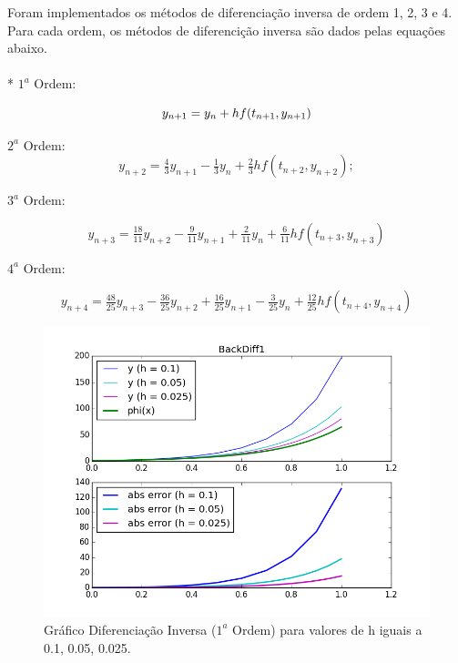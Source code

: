 \documentclass[a4paper]{article}
\begin{document}
Foram implementados os métodos de diferenciação inversa de ordem 1, 2, 3 e 4. Para cada ordem, os métodos de diferencição inversa são dados pelas equações abaixo.
\vspace{10mm} %
\\
\\*
$1^a$ Ordem: 

\begin{dmath}
\label{eq:backdiff1}
y_{n+1} = y_n + h f(t_{n+1}, y_{n+1}) \\
\end{dmath}

$2^a$ Ordem: 
\begin{dmath}
\label{eq:backdiff2}
y_{n+2} = \tfrac43 y_{n+1} - \tfrac13 y_n + \tfrac23 h f(t_{n+2}, y_{n+2});
\end{dmath}

$3^a$ Ordem: 

\begin{dmath}
\label{eq:backdiff3}
y_{n+3}  = \tfrac{18}{11} y_{n+2} - \tfrac9{11} y_{n+1} + \tfrac2{11} y_n + \tfrac6{11} h f(t_{n+3}, y_{n+3})
\end{dmath}

$4^a$ Ordem: 

\begin{dmath}
\label{eq:backdiff4}
y_{n+4} = \tfrac{48}{25} y_{n+3} - \tfrac{36}{25} y_{n+2} + \tfrac{16}{25} y_{n+1} - \tfrac{3}{25} y_n + \tfrac{12}{25} h f(t_{n+4}, y_{n+4}) 
\end{dmath}

\begin{figure}[!htb]
\centering
\includegraphics[width=1.0\textwidth]{plots/BackDiff1.png}
\caption{\label{fig:backdiff1}Gráfico Diferenciação Inversa ($1^a$ Ordem) para valores de h iguais a 0.1, 0.05, 0.025.}
\end{figure}
\end{document}
